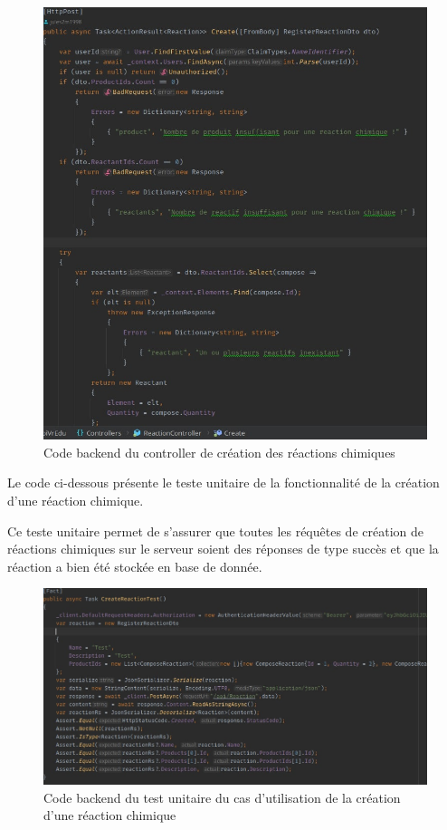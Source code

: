 \begin{figure}[H]
	\centering
	\includegraphics[width=1\textwidth]{img/crec}
	\caption{Code backend du controller de création des réactions chimiques}
\end{figure}

Le code ci-dessous présente le teste unitaire de la fonctionnalité de la création d'une réaction chimique.

Ce teste unitaire permet de s'assurer que toutes les réquêtes de création de réactions chimiques sur le serveur soient des réponses de type succès et que la réaction a bien été stockée en base de donnée.

\begin{figure}[H]
	\centering
	\includegraphics[width=1\textwidth]{img/creac}
	\caption{Code backend du test unitaire du cas d'utilisation de la création d'une réaction chimique}
\end{figure}

